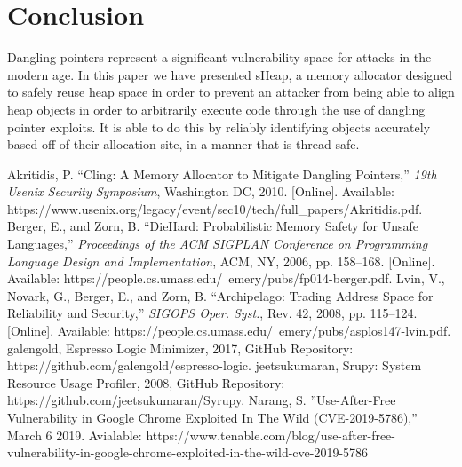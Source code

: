 \documentclass[conference]{IEEEtran}
\begin{document}
\section{Conclusion}
Dangling pointers represent a significant vulnerability space for attacks in the modern age. 
In this paper we have presented sHeap, a memory allocator designed to safely reuse heap space 
in order to prevent an attacker from being able to align heap objects in order to arbitrarily 
execute code through the use of dangling pointer exploits. It is able to do this by reliably 
identifying objects accurately based off of their allocation site, in a manner that is thread 
safe.

\begin{thebibliography}{00}
 Akritidis, P. ``Cling: A Memory Allocator to Mitigate Dangling Pointers,'' \textit{19th Usenix Security Symposium}, Washington DC, 2010. [Online]. Available: https://www.usenix.org/legacy/event/sec10/tech/full\_papers/Akritidis.pdf.
 Berger, E., and Zorn, B. ``DieHard: Probabilistic Memory Safety for Unsafe Languages,'' \textit{Proceedings of the ACM SIGPLAN Conference on Programming Language Design and Implementation}, ACM, NY, 2006, pp. 158--168. [Online]. Available: https://people.cs.umass.edu/~emery/pubs/fp014-berger.pdf.
 Lvin, V., Novark, G., Berger, E., and Zorn, B. ``Archipelago: Trading Address Space for Reliability and Security,'' \textit{SIGOPS Oper. Syst.}, Rev. 42, 2008, pp. 115--124. [Online]. Available: https://people.cs.umass.edu/~emery/pubs/asplos147-lvin.pdf.
 galengold, Espresso Logic Minimizer, 2017, GitHub Repository: https://github.com/galengold/espresso-logic.
 jeetsukumaran, Srupy: System Resource Usage Profiler, 2008, GitHub Repository: https://github.com/jeetsukumaran/Syrupy.
 Narang, S. ''Use-After-Free Vulnerability in Google Chrome Exploited In The Wild (CVE-2019-5786),'' March 6 2019. Avialable: https://www.tenable.com/blog/use-after-free-vulnerability-in-google-chrome-exploited-in-the-wild-cve-2019-5786
\end{thebibliography}
\end{document}
